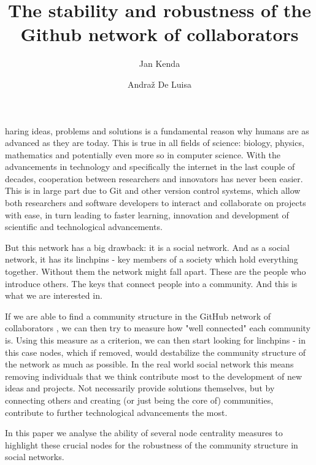 \documentclass[9pt,twocolumn,twoside]{pnas-new}
\title{The stability and robustness of the Github network of collaborators}
\author[a]{Jan Kenda}
\author[b]{Andraž De Luisa}
\affil[a]{University of Ljubljana, Faculty of Computer and Information Science, Ljubljana, Slovenia, jk3977@student.uni-lj.si
}
\affil[b]{University of Ljubljana, Faculty of Computer and Information Science, Ljubljana, Slovenia, ad9366@student.uni-lj.si
}
\begin{document}
\maketitle
\thispagestyle{firststyle}

haring ideas, problems and solutions is a fundamental reason why humans are as advanced as they are today.
This is true in all fields of science: biology, physics, mathematics and potentially even more so in computer science.
With the advancements in technology and specifically the internet in the last couple of decades, 
cooperation between researchers and innovators has never been easier.
This is in large part due to Git and other version control systems, 
which allow both researchers and software developers to interact and collaborate on projects with ease,
in turn leading to faster learning, innovation and development of scientific and technological advancements.

But this network has a big drawback: it is a social network.
And as a social network, it has its linchpins - key members of a society which hold everything together.
Without them the network might fall apart. 
These are the people who introduce others. 
The keys that connect people into a community.
And this is what we are interested in.

If we are able to find a community structure in the GitHub network of collaborators \cite{github-network}, 
we can then try to measure how "well connected" each community is.
Using this measure as a criterion, we can then start looking for linchpins - 
in this case nodes, which if removed, would destabilize the community structure of the network as much as possible.
In the real world social network this means removing individuals that we think contribute most to the development of new ideas and projects.
Not necessarily provide solutions themselves, but by connecting others and creating (or just being the core of) communities, contribute to
further technological advancements the most.

In this paper we analyse the ability of several node centrality measures to highlight these crucial nodes for the robustness of the community structure in social networks.
\end{document}
